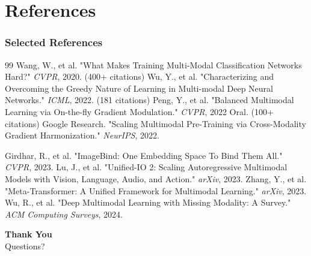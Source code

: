 \documentclass[serif, aspectratio=169]{beamer}
\begin{document}
\section*{References}
\begin{frame}[allowframebreaks]
    \frametitle<presentation>{Selected References}
    \footnotesize
    \begin{thebibliography}{99}
         Wang, W., et al. "What Makes Training Multi-Modal Classification Networks Hard?" \textit{CVPR}, 2020. (400+ citations)
         Wu, Y., et al. "Characterizing and Overcoming the Greedy Nature of Learning in Multi-modal Deep Neural Networks." \textit{ICML}, 2022. (181 citations)
         Peng, Y., et al. "Balanced Multimodal Learning via On-the-fly Gradient Modulation." \textit{CVPR}, 2022 Oral. (100+ citations)
         Google Research. "Scaling Multimodal Pre-Training via Cross-Modality Gradient Harmonization." \textit{NeurIPS}, 2022.
        
         Girdhar, R., et al. "ImageBind: One Embedding Space To Bind Them All." \textit{CVPR}, 2023.
         Lu, J., et al. "Unified-IO 2: Scaling Autoregressive Multimodal Models with Vision, Language, Audio, and Action." \textit{arXiv}, 2023.
         Zhang, Y., et al. "Meta-Transformer: A Unified Framework for Multimodal Learning." \textit{arXiv}, 2023.
         Wu, R., et al. "Deep Multimodal Learning with Missing Modality: A Survey." \textit{ACM Computing Surveys}, 2024.
    \end{thebibliography}
\end{frame}

\begin{frame}
    \centering
    \vspace{1cm}
    \Huge \textbf{Thank You}
    \vspace{0.5cm}
    \Large \\ Questions?
\end{frame}
	
\end{document}
